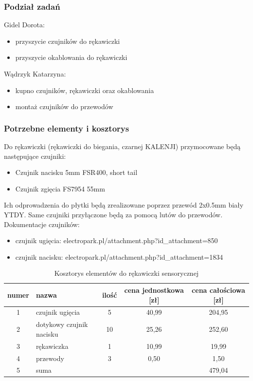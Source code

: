 \documentclass{article}
\begin{document}
\subsubsection{Podział zadań}
Gidel Dorota:
\begin{itemize}
    \item przyszycie czujników do rękawiczki
    \item przyszycie okablowania do rękawiczki
\end{itemize}
Wądrzyk Katarzyna:
\begin{itemize}
    \item kupno czujników, rękawiczki oraz okablowania
    \item montaż czujników do przewodów
\end{itemize}
\subsubsection{Potrzebne elementy i kosztorys}
Do rękawiczki (rękawiczki do biegania, czarnej KALENJI) przymocowane będą następujące czujniki:
\begin{itemize}
    \item Czujnik nacisku 5mm FSR400, short tail
    \item Czujnik zgięcia FS7954 55mm
\end{itemize}
Ich odprowadzenia do płytki będą zrealizowane poprzez przewód 2x0.5mm biały YTDY.
Same czujniki przyłączone będą za pomocą lutów do przewodów.
Dokumentacje czujników:

\begin{itemize}
  \item czujnik ugięcia: electropark.pl/attachment.php?id\textit{\_}attachment=850
  \item czujnik nacisku: electropark.pl/attachment.php?id\textit{\_}attachment=1834

\end{itemize}

\begin{table}[ht!]
\centering
\caption{Kosztorys elementów do rękawiczki sensorycznej}
\begin{tabular}{|c|l|c|c|c|}
\hline
    numer & nazwa & ilość & cena jednostkowa [zł] & cena całościowa [zł] \\
 \hline
    1 & czujnik ugięcia & 5 & 40,99 & 204,95 \\
    2 & dotykowy czujnik nacisku & 10 & 25,26 & 252,60 \\
    3 & rękawiczka & 1 & 10,99 & 19,99 \\
    4 & przewody & 3 & 0,50 & 1,50 \\
    \hline
    5 & suma & & & 479,04\\
    \hline
\end{tabular}
\label{tab:rekawiczka}
\end{table}
\end{document}
